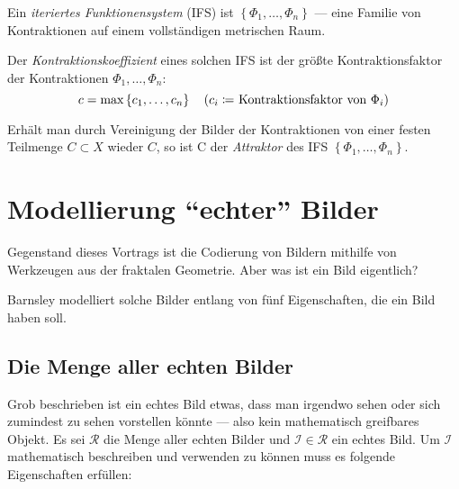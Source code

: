 \documentclass[afourpaper]{tufte-handout}
\begin{document}
Ein \emph{iteriertes Funktionensystem} (IFS) ist \( \left \{ \Phi_1, \dots, \Phi_n \right \} \) --- eine Familie von Kontraktionen auf einem vollständigen metrischen Raum.

Der \emph{Kontraktionskoeffizient} eines solchen IFS ist der größte Kontraktionsfaktor der Kontraktionen \( \Phi_1, \dots, \Phi_n \):
\begin{equation*}
  c = \max\left \{ c_1, \dots,c_n \right \} \quad \text{(\( c_i \coloneqq \) Kontraktionsfaktor von \( \Phi_i \))}
\end{equation*}

Erhält man durch Vereinigung der Bilder der Kontraktionen von einer festen Teilmenge \( C \subset X \) wieder \( C \), so ist C der \emph{Attraktor} des IFS \( \left \{ \Phi_1, \dots, \Phi_n \right \} \).

\section{Modellierung ``echter'' Bilder}

Gegenstand dieses Vortrags ist die Codierung von Bildern mithilfe von Werkzeugen aus der fraktalen Geometrie. Aber was ist ein Bild eigentlich?

Barnsley modelliert solche Bilder entlang von fünf Eigenschaften, die ein Bild haben soll.

\subsection{Die Menge aller echten Bilder}

Grob beschrieben ist ein echtes Bild etwas, dass man irgendwo sehen oder sich zumindest zu sehen vorstellen könnte --- also kein mathematisch greifbares Objekt. Es sei \( \mathcal{R} \) die Menge aller echten Bilder und \( \mathcal{I} \in \mathcal{R} \) ein echtes Bild. Um \( \mathcal{I} \) mathematisch beschreiben und verwenden zu können muss es folgende Eigenschaften erfüllen:
\end{document}
